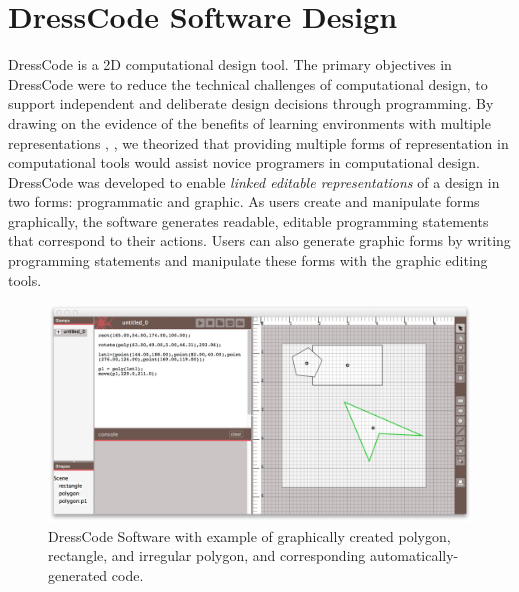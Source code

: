 \documentclass{sigchi}
\begin{document}
\section{DressCode Software Design}
DressCode is a 2D computational design tool. The primary objectives in DressCode were to reduce the technical challenges of computational design, to support independent and deliberate design decisions through programming. By drawing on the evidence of the benefits of learning environments with multiple representations \cite{ainsworth}, \cite{}, we theorized that providing multiple forms of representation in computational tools would assist novice programers in computational design. DressCode was developed to enable \emph{linked editable representations} of a design in two forms: programmatic and graphic. As users create and manipulate forms graphically, the software generates readable, editable programming statements that correspond to their actions. Users can also generate graphic forms by writing programming statements and manipulate these forms with the graphic editing tools. %
\begin{center}
\begin{figure}[h!]
\includegraphics[width=\columnwidth]{images/auto_generated_code.jpg}
\caption{DressCode Software with example of graphically created polygon, rectangle, and irregular polygon, and corresponding automatically-generated code.}
\label{fig:auto_generated_code}
\end{figure}
\end{center}
\vspace{-20pt}
\end{document}
